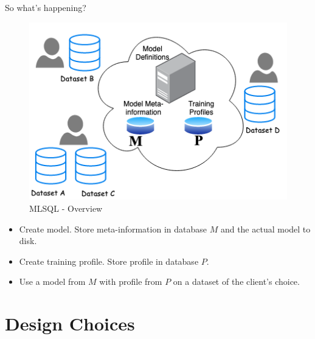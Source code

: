 \documentclass[handout, xcolor={dvipsnames}]{beamer}
\begin{document}
\begin{frame}{So what's happening?}
\begin{figure}
    \centering
    \includegraphics[scale = 0.35]{System_diag.png}
    \caption{MLSQL - Overview}
    \label{fig:system_overview}
\end{figure}
\begin{itemize}
    \item Create model. Store meta-information in database $M$ and the actual model to disk.
    \item Create training profile. Store profile in database $P$.
    \item Use a model from $M$ with profile from $P$ on a dataset of the client's choice.
\end{itemize}
    
\end{frame}

\section{Design Choices}
\end{document}
